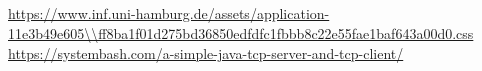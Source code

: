 \documentclass[twoside]{article}
\begin{document}
\subsection{}
\subsection{}

\begin{thebibliography}{1}
	\url{https://www.inf.uni-hamburg.de/assets/application-11e3b49e605\\ff8ba1f01d275bd36850edfdfc1fbbb8c22e55fae1baf643a00d0.css}
	\url{https://systembash.com/a-simple-java-tcp-server-and-tcp-client/}
\end{thebibliography}
\end{document}
